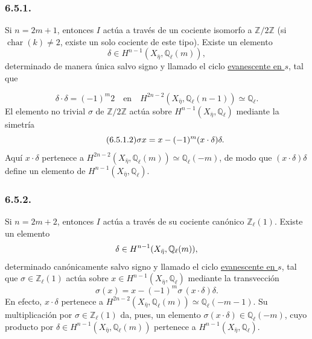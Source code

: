 \subsubsection*{6.5.1.}

Si $n=2m+1$, entonces $I$ actúa a través de un cociente isomorfo a
$\mathbb Z/2\mathbb Z$ (si $\operatorname{char}(k)\ne2$, existe un solo
cociente de este tipo). Existe un elemento
\[
\delta\in H^{n-1}(X_{\bar\eta},\mathbb Q_\ell(m)),
\]
determinado de manera única salvo signo y llamado el ciclo
\underline{evanescente en $s$}, tal que

\pageoriginale

\begin{equation}\tag{6.5.1.1}
\delta\cdot\delta=(-1)^m2
\quad\text{en}\quad
H^{2n-2}(X_{\bar\eta},\mathbb Q_\ell(n-1))\simeq\mathbb Q_\ell.
\end{equation}
El elemento no trivial $\sigma$ de $\mathbb Z/2\mathbb Z$ actúa sobre
$H^{n-1}(X_{\bar\eta},\mathbb Q_\ell)$ mediante la simetría
\begin{equation}\tag{\sisi{6.5.2.2}{6.5.1.2}}
\sigma x=x-(-1)^m(x\cdot\delta)\delta.
\end{equation}
Aquí $x\cdot\delta$ pertenece a
$H^{2n-2}(X_{\bar\eta},\mathbb Q_\ell(m))\simeq\mathbb Q_\ell(-m)$,
de modo que $(x\cdot\delta)\delta$ define un elemento de
$H^{n-1}(X_{\bar\eta},\mathbb Q_\ell)$.

\subsubsection*{6.5.2.}

Si $n=2m+2$, entonces $I$ actúa a través de su cociente canónico
$\mathbb Z_\ell(1)$. Existe un elemento
\[
\delta\in
\sisi{H^{n-1}(X_{\bar\eta},\mathbb Q_\ell(m)}
{H^{n-1}(X_{\bar\eta},\mathbb Q_\ell(m))},
\]
determinado canónicamente salvo signo y llamado el ciclo
\underline{evanescente en $s$}, tal que
$\sigma\in\mathbb Z_\ell(1)$ actúa sobre
$x\in H^{n-1}(X_{\bar\eta},\mathbb Q_\ell)$ mediante la transvección
\begin{equation}\tag{6.5.2.1}
\sigma(x)=x-(-1)^m\sigma\,(x\cdot\delta)\delta.
\end{equation}
En efecto, $x\cdot\delta$ pertenece a
$H^{2n-2}(X_{\bar\eta},\mathbb Q_\ell(m))
\simeq\mathbb Q_\ell(-m-1)$. Su multiplicación por
$\sigma\in\mathbb Z_\ell(1)$ da, pues, un elemento
$\sigma(x\cdot\delta)\in\mathbb Q_\ell(-m)$, cuyo producto por
$\delta\in H^{n-1}(X_{\bar\eta},\mathbb Q_\ell(m))$ pertenece a
$H^{n-1}(X_{\bar\eta},\mathbb Q_\ell)$.

